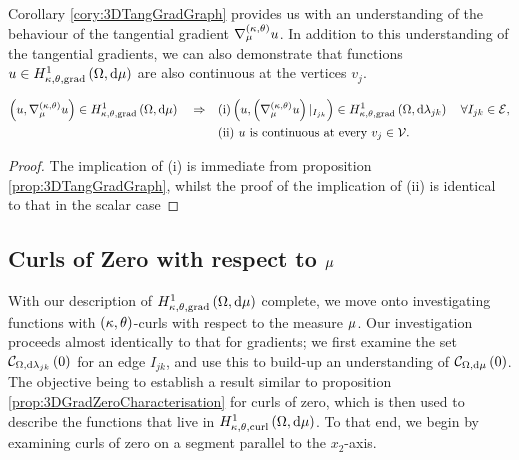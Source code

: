 Corollary \ref{cory:3DTangGradGraph} provides us with an understanding of the behaviour of the tangential gradient $\nabla^{\left( \kappa, \theta \right)}_{\mu}u$.
In addition to this understanding of the tangential gradients, we can also demonstrate that functions $u\in H^1_{\kappa,\theta,\mathrm{grad}}\left( \Omega, \mathrm{d}\mu \right)$ are also continuous at the vertices $v_j$.
\begin{prop} \label{prop:3DVertexContinuity-Grad}
	\begin{align*}
		\left( u, \nabla^{\left( \kappa, \theta \right)}_{\mu}u \right)\in H^1_{\kappa,\theta,\mathrm{grad}}\left( \Omega, \mathrm{d}\mu \right) \quad\Rightarrow\quad
		&\mathrm{(i)} \left( u, \left( \nabla^{\left( \kappa, \theta \right)}_{\mu} u \right)\vert_{I_{jk}}  \right)\in H^1_{\kappa,\theta,\mathrm{grad}}\left( \Omega, \mathrm{d}\lambda_{jk} \right) \quad \forall I_{jk}\in\mathcal{E}, \\
		&\mathrm{(ii)} \ u \text{ is continuous at every } v_j\in\mathcal{V}.
	\end{align*}
\end{prop}
\begin{proof}
	The implication of (i) is immediate from proposition \ref{prop:3DTangGradGraph}, whilst the proof of the implication of (ii) is identical to that in the scalar case 
\end{proof}

\subsection{Curls of Zero with respect to $\mu$} \label{apps:CurlsOfZero}
With our description of $H^1_{\kappa,\theta,\mathrm{grad}}\left( \Omega, \mathrm{d}\mu \right)$ complete, we move onto investigating functions with $\left( \kappa, \theta \right)$-curls with respect to the measure $\mu$.
Our investigation proceeds almost identically to that for gradients; we first examine the set $\mathcal{C}_{ \Omega, \mathrm{d}\lambda_{jk}}\left( 0 \right)$ for an edge $I_{jk}$, and use this to build-up an understanding of $\mathcal{C}_{ \Omega, \mathrm{d}\mu}\left( 0 \right)$.
The objective being to establish a result similar to proposition \ref{prop:3DGradZeroCharacterisation} for curls of zero, which is then used to describe the functions that live in $H^1_{\kappa,\theta,\mathrm{curl}}\left( \Omega, \mathrm{d}\mu \right)$.
To that end, we begin by examining curls of zero on a segment parallel to the $x_2$-axis.

